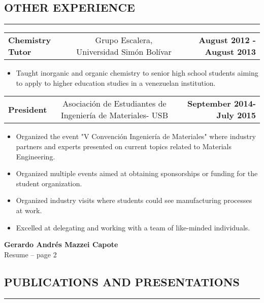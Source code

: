 \documentclass[11pt,letterpaper]{article}
\makeatletter
\newcommand{\headerrow}[3]
{\vspace{0.4em}
\noindent
\begin{tabular*}{\textwidth}{l @{\extracolsep{\fill}} cr}
	\textbf{#1} & %
	#2 &		  %
	\textbf{#3}\\ %
\end{tabular*}}
\makeatother
\begin{document}
\subsection*{OTHER EXPERIENCE}

\vspace{-0.5em}
\hrule
	
	\headerrow
		{Chemistry Tutor}
		{Grupo Escalera, Universidad Simón Bolívar} %
		{August 2012 - August 2013}
	\begin{itemize}
		\item Taught inorganic and organic chemistry to senior high school students aiming to apply to higher education studies in a venezuelan institution.
\end{itemize}	
	\headerrow
		{President}
		{Asociación de Estudiantes de Ingeniería de Materiales- USB} %
		{September 2014- July 2015}
		\begin{itemize}
			\item Organized the event "V Convención Ingeniería de Materiales" where industry partners and experts presented on current topics related to Materials Engineering.
			\item Organized multiple events aimed at obtaining sponsorships or funding for the student organization.
			\item Organized industry visits where students could see manufacturing processes at work. 
			\item Excelled at delegating and working with a team of like-minded individuals.
	\end{itemize}
	
\pagebreak %
\thispagestyle{empty} %

\begin{center}
	\LARGE \textbf{Gerardo Andrés Mazzei Capote} \\
	\normalsize Resume -- page 2
\end{center}

\subsection*{PUBLICATIONS AND PRESENTATIONS}

	\vspace{-0.5em}
	\hrule
	
\end{document}
